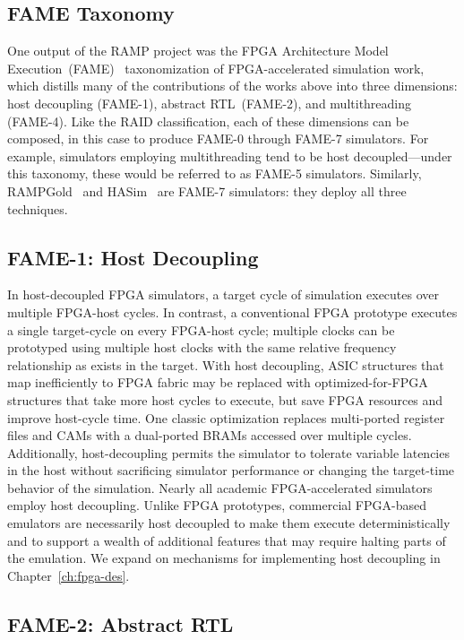 \subsection{FAME Taxonomy}

One output of the RAMP project was the FPGA Architecture Model
Execution~(FAME)~\cite{FAME} taxonomization of FPGA-accelerated simulation
work, which distills many of the contributions of the works above into three
dimensions: host decoupling (FAME-1), abstract RTL~(FAME-2), and multithreading
(FAME-4). Like the RAID classification, each of these dimensions can be
composed, in this case to produce FAME-0 through FAME-7 simulators. For example, simulators
employing multithreading tend to be host decoupled---under this taxonomy, these
would be referred to as FAME-5 simulators. Similarly, RAMPGold~\cite{RAMPGold}
and HASim~\cite{HASim} are FAME-7 simulators: they deploy all three techniques.

\subsection{FAME-1: Host Decoupling}\label{sec:fame1}

In host-decoupled FPGA simulators, a target cycle of simulation
executes over multiple FPGA-host cycles. In contrast, a
conventional FPGA prototype executes a single target-cycle on every FPGA-host
cycle; multiple clocks can be prototyped using multiple host clocks with the
same relative frequency relationship as exists in the target.
With host decoupling, ASIC structures that map inefficiently to FPGA fabric may be replaced
with optimized-for-FPGA structures that take more host cycles to execute, but save
FPGA resources and improve host-cycle time.  One classic optimization replaces
multi-ported register files and CAMs with a dual-ported BRAMs accessed over
multiple cycles.  Additionally, host-decoupling permits the simulator to
tolerate variable latencies in the host without sacrificing simulator
performance or changing the target-time behavior of the simulation.
Nearly all academic FPGA-accelerated simulators employ host decoupling.
Unlike FPGA prototypes, commercial FPGA-based emulators are necessarily host decoupled to
make them execute deterministically and to support a wealth of additional features that may require
halting parts of the emulation. We expand on mechanisms for implementing host decoupling in Chapter~\ref{ch:fpga-des}.

\subsection{FAME-2: Abstract RTL}

